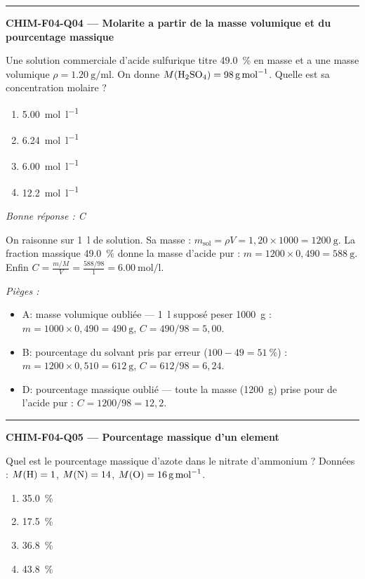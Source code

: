 \documentclass[11pt,a4paper]{article}
\begin{document}
\vspace{8pt}\hrule\vspace{8pt}
\noindent\textbf{CHIM-F04-Q04 --- Molarite a partir de la masse volumique et du pourcentage massique}\par
Une solution commerciale d'acide sulfurique  titre \qty{49.0}{\percent} en masse et a une masse volumique $\rho = \qty{1.20}{\gram\per\milli\litre}$. On donne $M(\ce{H2SO4}) = \qty{98}{\gram\per\mole}$. Quelle est sa concentration molaire ?
\begin{enumerate}[label=\Alph*)]
\item \qty{5.00}{\mole\per\litre}
\item \qty{6.24}{\mole\per\litre}
\item \qty{6.00}{\mole\per\litre}
\item \qty{12.2}{\mole\per\litre}
\end{enumerate}
\textit{Bonne réponse : C}\par
On raisonne sur \qty{1}{\litre} de solution. Sa masse : $m_{\text{sol}} = \rho V = 1{,}20\times 1000 = \qty{1200}{\gram}$. La fraction massique \qty{49.0}{\percent} donne la masse d'acide pur : $m = 1200\times 0{,}490 = \qty{588}{\gram}$. Enfin $C = \frac{m/M}{V} = \frac{588/98}{1} = \qty{6.00}{\mole\per\litre}$.\par
\textit{Pièges :}
\begin{itemize}
\item A: masse volumique oubliée --- \qty{1}{\litre} supposé peser \qty{1000}{\gram} : $m = 1000\times 0{,}490 = \qty{490}{\gram}$, $C = 490/98 = 5{,}00$.
\item B: pourcentage du solvant pris par erreur ($100-49 = \qty{51}{\percent}$) : $m = 1200\times 0{,}510 = \qty{612}{\gram}$, $C = 612/98 = 6{,}24$.
\item D: pourcentage massique oublié --- toute la masse (\qty{1200}{\gram}) prise pour de l'acide pur : $C = 1200/98 = 12{,}2$.
\end{itemize}
\vspace{8pt}\hrule\vspace{8pt}
\noindent\textbf{CHIM-F04-Q05 --- Pourcentage massique d'un element}\par
Quel est le pourcentage massique d'azote dans le nitrate d'ammonium  ? Données : $M(\ce{H}) = 1$, $M(\ce{N}) = 14$, $M(\ce{O}) = \qty{16}{\gram\per\mole}$.
\begin{enumerate}[label=\Alph*)]
\item \qty{35.0}{\percent}
\item \qty{17.5}{\percent}
\item \qty{36.8}{\percent}
\item \qty{43.8}{\percent}
\end{enumerate}
\end{document}
